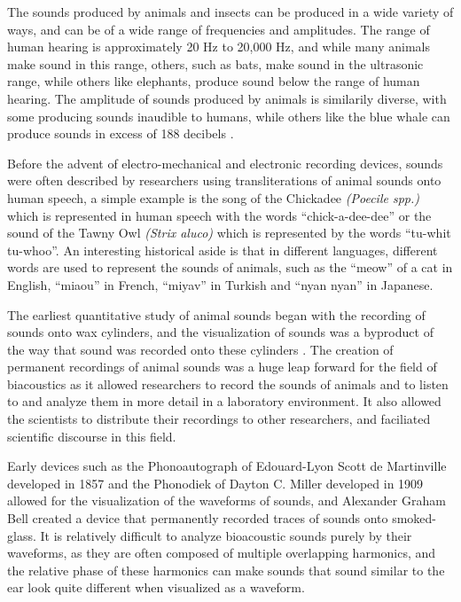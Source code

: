The sounds produced by animals and insects can be produced in a wide
variety of ways, and can be of a wide range of frequencies and
amplitudes.  The range of human hearing is approximately 20 Hz to
20,000 Hz, \cite{} and while many animals make sound in this range,
others, such as bats, make sound in the ultrasonic range, while others
like elephants, produce sound below the range of human hearing.  The
amplitude of sounds produced by animals is similarily diverse, with
some producing sounds inaudible to humans, while others like the blue
whale can produce sounds in excess of 188 decibels \cite{}.

Before the advent of electro-mechanical and electronic recording
devices, sounds were often described by researchers using
transliterations of animal sounds onto human speech, a simple example
is the song of the Chickadee \textit{(Poecile spp.)} which is
represented in human speech with the words ``chick-a-dee-dee'' or the
sound of the Tawny Owl \textit{(Strix aluco)} which is represented by
the words ``tu-whit tu-whoo''.  An interesting historical aside is
that in different languages, different words are used to represent the
sounds of animals, such as the ``meow'' of a cat in English, ``miaou''
in French, ``miyav'' in Turkish and ``nyan nyan'' in Japanese.

The earliest quantitative study of animal sounds began with the
recording of sounds onto wax cylinders, and the visualization of
sounds was a byproduct of the way that sound was recorded onto these
cylinders \cite{}.  The creation of permanent recordings of animal
sounds was a huge leap forward for the field of biacoustics as it
allowed researchers to record the sounds of animals and to listen to
and analyze them in more detail in a laboratory environment.  It also
allowed the scientists to distribute their recordings to other
researchers, and faciliated scientific discourse in this field.

Early devices such as the Phonoautograph of Edouard-Lyon Scott de
Martinville developed in 1857 and the Phonodiek of Dayton C. Miller
developed in 1909 allowed for the visualization of the waveforms of
sounds, and Alexander Graham Bell created a device that permanently
recorded traces of sounds onto smoked-glass.  It is relatively
difficult to analyze bioacoustic sounds purely by their waveforms, as
they are often composed of multiple overlapping harmonics, and the
relative phase of these harmonics can make sounds that sound similar
to the ear look quite different when visualized as a waveform.

